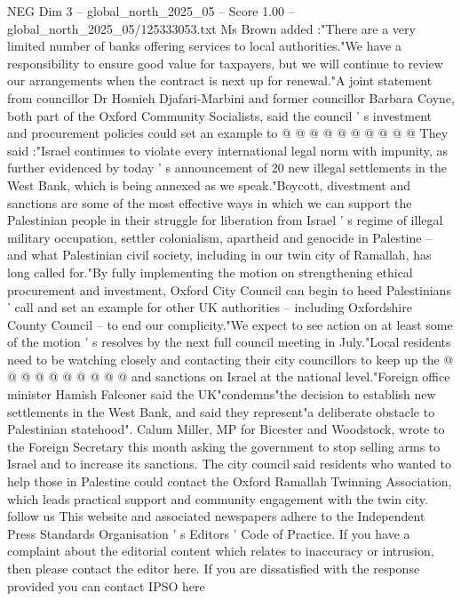 \begin{textsample}{NEG Dim 3 – global\_north\_2025\_05 – Score 1.00 – global\_north\_2025\_05/125333053.txt}
Ms Brown added :"There are a very limited number of banks offering services to local authorities."We have a responsibility to ensure good value for taxpayers, but we will continue to review our arrangements when the contract is next up for renewal."A joint statement from councillor Dr Hosnieh Djafari-Marbini and former councillor Barbara Coyne, both part of the Oxford Community Socialists, said the council ' s investment and procurement policies could set an example to @ @ @ @ @ @ @ @ @ @ They said :"Israel continues to violate every international legal norm with impunity, as further evidenced by today ' s announcement of 20 new illegal settlements in the West Bank, which is being annexed as we speak."Boycott, divestment and sanctions are some of the most effective ways in which we can support the Palestinian people in their struggle for liberation from Israel ' s regime of illegal military occupation, settler colonialism, apartheid and genocide in Palestine -- and what Palestinian civil society, including in our twin city of Ramallah, has long called for."By fully implementing the motion on strengthening ethical procurement and investment, Oxford City Council can begin to heed Palestinians ' call and set an example for other UK authorities -- including Oxfordshire County Council -- to end our complicity."We expect to see action on at least some of the motion ' s resolves by the next full council meeting in July."Local residents need to be watching closely and contacting their city councillors to keep up the @ @ @ @ @ @ @ @ @ @ and sanctions on Israel at the national level."Foreign office minister Hamish Falconer said the UK"condemns"the decision to establish new settlements in the West Bank, and said they represent"a deliberate obstacle to Palestinian statehood".
Calum Miller, MP for Bicester and Woodstock, wrote to the Foreign Secretary this month asking the government to stop selling arms to Israel and to increase its sanctions.
The city council said residents who wanted to help those in Palestine could contact the Oxford Ramallah Twinning Association, which leads practical support and community engagement with the twin city. follow us This website and associated newspapers adhere to the Independent Press Standards Organisation ' s Editors ' Code of Practice.
If you have a complaint about the editorial content which relates to inaccuracy or intrusion, then please contact the editor here.
If you are dissatisfied with the response provided you can contact IPSO here

\end{textsample}
